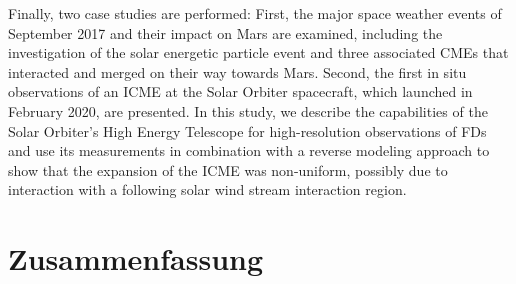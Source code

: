 Finally, two case studies are performed: First, the major space weather events of September 2017 and their impact on Mars are examined, including the investigation of the solar energetic particle event and three associated \acp{CME} that interacted and merged on their way towards Mars. Second, the first in situ observations of an \ac{ICME} at the Solar Orbiter spacecraft, which launched in February 2020, are presented. In this study, we describe the capabilities of the Solar Orbiter's High Energy Telescope for high-resolution observations of \aclp{FD} and use its measurements in combination with a reverse modeling approach to show that the expansion of the \ac{ICME} was non-uniform, possibly due to interaction with a following solar wind stream interaction region.


\cleardoublepage
{}
\chapter*{Zusammenfassung}

